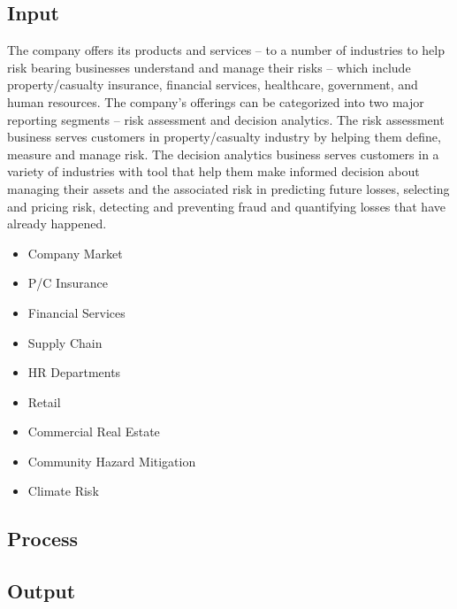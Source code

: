 \subsection{Input}
The company offers its products and services – to a number of industries to help risk bearing businesses
understand and manage their risks – which include property/casualty insurance, financial services, healthcare,
government, and human resources.
The company’s offerings can be categorized into two major reporting segments – risk assessment and decision
analytics. The risk assessment business serves customers in property/casualty industry by helping them define,
measure and manage risk. The decision analytics business serves customers in a variety of industries with tool
that help them make informed decision about managing their assets and the associated risk in predicting future
losses, selecting and pricing risk, detecting and preventing fraud and quantifying losses that have already
happened.
\begin{itemize}
\item Company Market
\item P/C Insurance
\item Financial Services
\item Supply Chain
\item HR Departments
\item Retail
\item Commercial Real Estate
\item Community Hazard Mitigation
\item Climate Risk
\end{itemize}
\subsection{Process}
\subsection{Output}
\cleardoublepage
